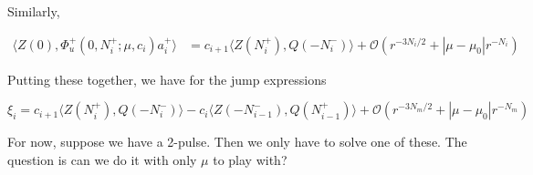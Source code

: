 \documentclass[12pt]{article}
\begin{document}
Similarly, 

\begin{align*}
\langle Z(0), \Phi_u^+(0, N_i^+; \mu, c_i) a_i^+ \rangle
&= c_{i+1} \langle Z(N_i^+), Q(-N_i^-) \rangle + \mathcal{O}( r^{-3 N_i/2} + |\mu - \mu_0| r^{-N_i})
\end{align*}

Putting these together, we have for the jump expressions

\[
\xi_i = c_{i+1} \langle Z(N_i^+), Q(-N_i^-) \rangle - c_i \langle Z(-N_{i-1}^-), Q(N_{i-1}^+) \rangle  + \mathcal{O}( r^{-3 N_m/2} + |\mu - \mu_0| r^{-N_m})
\]

For now, suppose we have a 2-pulse. Then we only have to solve one of these. The question is can we do it with only $\mu$ to play with?
\end{document}
